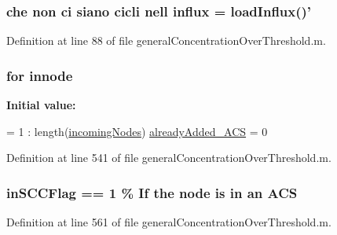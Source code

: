 \hypertarget{a00028_a637d2af7e7b03600bcaf1931b999e3fc}{
\subsubsection[{influx}]{ che non ci siano cicli nell influx = load\-Influx()'}}\label{a00028_a637d2af7e7b03600bcaf1931b999e3fc}


Definition at line 88 of file general\-Concentration\-Over\-Threshold.\-m.

\hypertarget{a00028_a21f06040cb68a910280e04d4c59d980e}{
\subsubsection[{innode}]{\setlength{\rightskip}{0pt plus 5cm}for innode}}\label{a00028_a21f06040cb68a910280e04d4c59d980e}
{\bfseries Initial value\-:}
\begin{DoxyCode}
= 1 : length(\hyperlink{a00028_a34c98e3306059653f2a214e5ef975e9c}{incomingNodes})
                            \hyperlink{a00028_a77c2cda04a3103708011753a77dceda3}{alreadyAdded\_ACS} = 0
\end{DoxyCode}


Definition at line 541 of file general\-Concentration\-Over\-Threshold.\-m.

\hypertarget{a00028_af1605fa33751cda7e0c840d6df8f8a59}{
\subsubsection[{in\-S\-C\-C\-Flag}]{ in\-S\-C\-C\-Flag == 1 \% If the node is in an {\bf A\-C\-S}}}\label{a00028_af1605fa33751cda7e0c840d6df8f8a59}


Definition at line 561 of file general\-Concentration\-Over\-Threshold.\-m.

